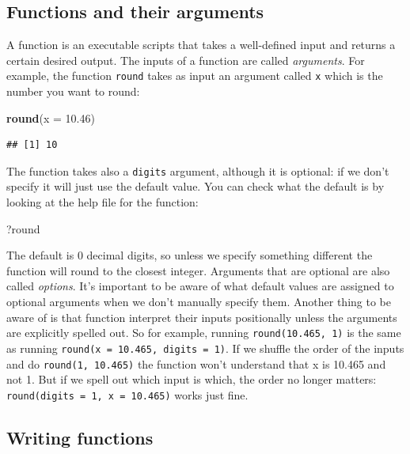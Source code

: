 \documentclass[
]{book}
\newenvironment{Shaded}{\begin{snugshade}}{\end{snugshade}}
\newcommand{\AttributeTok}[1]{\textcolor[rgb]{0.13,0.29,0.53}{#1}}
\newcommand{\FloatTok}[1]{\textcolor[rgb]{0.00,0.00,0.81}{#1}}
\newcommand{\FunctionTok}[1]{\textcolor[rgb]{0.13,0.29,0.53}{\textbf{#1}}}
\newcommand{\NormalTok}[1]{#1}
\begin{document}
\hypertarget{functions-and-their-arguments}{%
\subsection{Functions and their arguments}\label{functions-and-their-arguments}}

A function is an executable scripts that takes a well-defined input and returns
a certain desired output. The inputs of a function are called \emph{arguments}. For
example, the function \texttt{round} takes as input an argument called \texttt{x} which is
the number you want to round:

\begin{Shaded}
\begin{Highlighting}[]
\FunctionTok{round}\NormalTok{(}\AttributeTok{x =} \FloatTok{10.46}\NormalTok{)}
\end{Highlighting}
\end{Shaded}

\begin{verbatim}
## [1] 10
\end{verbatim}

The function takes also a \texttt{digits} argument, although it is optional: if we
don't specify it will just use the default value. You can check what the default
is by looking at the help file for the function:

\begin{Shaded}
\begin{Highlighting}[]
\NormalTok{?round}
\end{Highlighting}
\end{Shaded}

The default is 0 decimal digits, so unless we specify something different the
function will round to the closest integer. Arguments that are optional are also called \emph{options}. It's important to be aware of what default values are assigned
to optional arguments when we don't manually specify them. Another thing to be
aware of is that function interpret their inputs positionally unless the
arguments are explicitly spelled out. So for example, running \texttt{round(10.465,\ 1)}
is the same as running \texttt{round(x\ =\ 10.465,\ digits\ =\ 1)}. If we shuffle the order
of the inputs and do \texttt{round(1,\ 10.465)} the function won't understand that x is
10.465 and not 1. But if we spell out which input is which, the order no longer
matters: \texttt{round(digits\ =\ 1,\ x\ =\ 10.465)} works just fine.

\hypertarget{writing-functions}{%
\subsection{Writing functions}\label{writing-functions}}
\end{document}
